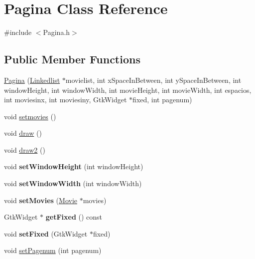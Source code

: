 \hypertarget{classPagina}{}\section{Pagina Class Reference}
\label{classPagina}


{\ttfamily \#include $<$Pagina.\+h$>$}

\subsection*{Public Member Functions}
\begin{DoxyCompactItemize}
\item 
\hyperlink{classPagina_a5f1b14b8a4d53e8c155dd6727444e875}{Pagina} (\hyperlink{classLinkedlist}{Linkedlist} $\ast$movielist, int x\+Space\+In\+Between, int y\+Space\+In\+Between, int window\+Height, int window\+Width, int movie\+Height, int movie\+Width, int espacios, int moviesinx, int moviesiny, Gtk\+Widget $\ast$fixed, int pagenum)
\item 
void \hyperlink{classPagina_a70b6828244ce579b7f31a5834439a4c6}{setmovies} ()
\item 
void \hyperlink{classPagina_a3443b322fb5eb076528970457daa5b34}{draw} ()
\item 
void \hyperlink{classPagina_a7c5939c4dcd981100471e89fdd5466f3}{draw2} ()
\item 
\mbox{\label{classPagina_a4a532070a787fc0eca99697357f6e506}} 
void {\bfseries set\+Window\+Height} (int window\+Height)
\item 
\mbox{\label{classPagina_aa8d0eaaca1234bacb850d5866aada4b0}} 
void {\bfseries set\+Window\+Width} (int window\+Width)
\item 
\mbox{\label{classPagina_ae50588aaeaeddde6a268617403be55cc}} 
void {\bfseries set\+Movies} (\hyperlink{classMovie}{Movie} $\ast$movies)
\item 
\mbox{\label{classPagina_a894ab5f23884a76584519d4aab0f8c47}} 
Gtk\+Widget $\ast$ {\bfseries get\+Fixed} () const
\item 
\mbox{\label{classPagina_a233884c0e769bd9bf7cc232cfac69b22}} 
void {\bfseries set\+Fixed} (Gtk\+Widget $\ast$fixed)
\item 
void \hyperlink{classPagina_a44d18e2ed349bf65f806ed1a5b2bb720}{set\+Pagenum} (int pagenum)

\end{DoxyCompactItemize}
